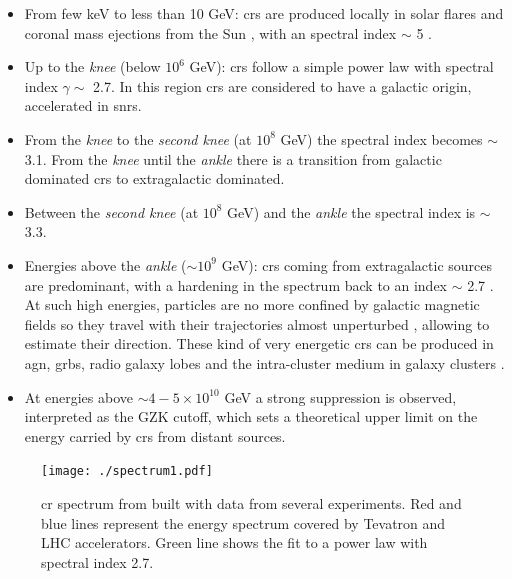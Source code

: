 \documentclass[main.tex]{subfiles}
\begin{document}
\begin{itemize}

    \item From few keV to less than 10 GeV: \glspl{cr} are produced locally in solar flares and coronal mass ejections from the Sun \cite{2017SolarCR_2}, with an spectral index $\sim$ 5 \cite{2017SolarCR}.  
    \item Up to the \textit{knee} (below $10^6$ GeV): \glspl{cr} follow a simple power law with spectral index $\gamma \sim$ 2.7. In this region \glspl{cr} are considered to have a galactic origin, accelerated in \glspl{snr}.
    
    \item From the \textit{knee} to the \textit{second knee} (at $10^{8}$ GeV) the spectral index becomes $\sim$ 3.1. From the \textit{knee} until the \textit{ankle} there is a transition from galactic dominated \glspl{cr} to extragalactic dominated.
    
    \item Between the \textit{second knee} (at $10^{8}$ GeV) and the \textit{ankle} the spectral index is $\sim$ 3.3.
    
    \item Energies above the \textit{ankle} ($\sim 10^{9}$ GeV): \glspl{cr} coming from extragalactic sources are predominant, with a hardening in the spectrum back to an index $\sim$ 2.7 . At such high energies, particles are no more confined by galactic magnetic fields so they travel with their trajectories almost unperturbed \cite{2013CRbook}, allowing to estimate their direction. These kind of very energetic \glspl{cr} can be produced in \gls{agn}, \glspl{grb}, radio galaxy lobes and the intra-cluster medium in galaxy clusters \cite{2019openquestionsUHECR}.
      
    \item At energies above $\sim 4-5 \times 10^{10}$ GeV a strong suppression is observed, interpreted as the GZK cutoff, which sets a theoretical upper limit on the energy carried by \glspl{cr} from distant sources.
    \end{itemize}
    
    \begin{figure}[h]
        \centering
        \texttt{[image: ./spectrum1.pdf]}
        \caption{\gls{cr} spectrum from \cite{crspec} built with data from several experiments. Red and blue lines represent the energy spectrum covered by Tevatron and LHC accelerators. Green line shows the fit to a power law with spectral index 2.7.}
        \label{fig:CRspectrum}
    \end{figure}
    
\end{document}
